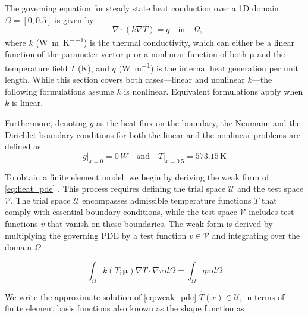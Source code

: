 \documentclass[11pt]{article}
\begin{document}
    The governing equation for steady state heat conduction over a 1D domain $\Omega = [0,0.5]$ is given by
    \begin{equation}
    -\nabla \cdot (k \nabla T) = q \quad \text{in} \quad \Omega,
    \label{eq:heat_pde}
    \end{equation}
    where $k$ ({\unit{\watt\per\meter\per\kelvin}}) is the thermal conductivity, which can either be a linear function of the parameter vector $\boldsymbol{\mu}$ or a nonlinear function of both $\boldsymbol{\mu}$ and the temperature field $T$ ({\unit{\kelvin}}), and \( q \) (\unit{\watt\per\meter}) is the internal heat generation per unit length.
    While this section covers both cases—linear and nonlinear \( k \)—the following formulations assume $k$ is nonlinear.
    Equivalent formulations apply when \( k \) is linear.


    Furthermore, denoting \( g \)  as the heat flux on the boundary, the Neumann and the Dirichlet boundary conditions for both the linear and the nonlinear problems are defined as
    \begin{equation}
       \left. g\right|_{x = 0} = 0\, \unit{W} \quad \text{and} \quad \left.T\right|_{x = 0.5} = 573.15 \, \text{K}
    \end{equation}





    To obtain a finite element model, we begin by deriving the weak form of \cref{eq:heat_pde} \cite{nreddy2018introduction,hughes2012finite}.
    This process requires defining the trial space \( \mathcal{U} \) and the test space \( \mathcal{V} \).
    The trial space \( \mathcal{U} \) encompasses admissible temperature functions \( T \) that comply with essential boundary conditions, while the test space \( \mathcal{V} \) includes test functions \( v \) that vanish on these boundaries.
    The weak form is derived by multiplying the governing PDE by a test function \( v \in \mathcal{V} \) and integrating over the domain \( \Omega \):

    \begin{equation}
    \int_{\Omega} k(T;\boldsymbol\mu)\nabla T \cdot \nabla v \, d\Omega  = \int_{\Omega} q v \, d\Omega
    \label{eq:weak_pde}
    \end{equation}


    We write the approximate solution of \cref{eq:weak_pde} \( \widehat{T}(x) \in \mathcal{U} \), in terms of finite element basis functions also known as the shape function as
\end{document}
